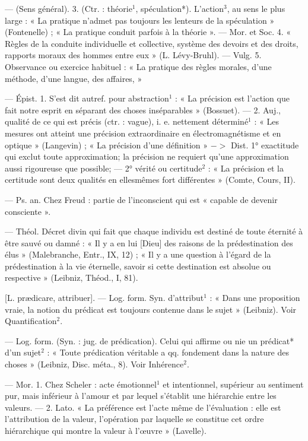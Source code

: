 \begin{itemize}[leftmargin=1cm, label=, itemsep=1pt]
 — (Sens général).
3. (Ctr. : théorie$^1$, spéculation*).
L'action$^3$, au sens le plus large : « La
pratique n’admet pas toujours les
lenteurs de la spéculation » (Fontenelle) ; « La pratique conduit parfois
à la théorie ». — Mor. et Soc. 4.
« Règles de la conduite individuelle
et collective, système des devoirs et
des droits, rapports moraux des
hommes entre eux » (L. Lévy-Bruhl). — Vulg. 5. Observance ou
exercice habituel : « La pratique
des règles morales, d’une méthode,
d’une langue, des affaires, »

 — Épist. 1. S’est dit autref.
pour abstraction$^1$ : « La précision
est l’action que fait notre esprit en
séparant des choses inséparables »
(Bossuet). — 2. Auj., qualité de ce
qui est précis (ctr. : vague), i. e. nettement déterminé$^1$ : « Les mesures
ont atteint une précision extraordinaire en électromagnétisme et en
optique » (Langevin) ; « La précision
d'une définition » $->$ Dist.
1° exactitude qui exclut toute approximation; la précision ne requiert
qu’une approximation aussi rigoureuse que possible; — 2° vérité ou
certitude$^2$ : « La précision et la certitude sont deux qualités en ellesmêmes fort différentes » (Comte,
Cours, II).

 — Ps. an. Chez Freud :
partie de l'inconscient qui est « capable de devenir consciente ».

 — Théol. Décret divin
qui fait que chaque individu est
destiné de toute éternité à être
sauvé ou damné : « Il y a en lui
[Dieu] des raisons de la prédestination des élus » (Malebranche, Entr.,
IX, 12) ; « Il y a une question à
l'égard de la prédestination à la vie
éternelle, savoir si cette destination est absolue ou respective »
(Leibniz, Théod., I, 81).

 [L. prædicare, attribuer].
— Log. form. Syn. d'attribut$^1$ :
« Dans une proposition vraie, la
notion du prédicat est toujours contenue dans le sujet » (Leibniz). Voir
Quantification$^2$.

 — Log. form.
(Syn. : jug. de prédication). Celui qui
affirme ou nie un prédicat* d’un
sujet$^2$ : « Toute prédication véritable
a qq. fondement dans la nature des
choses » (Leibniz, Disc. méta., 8).
Voir Inhérence$^2$.

 — Mor. 1. Chez Scheler :
acte émotionnel$^1$ et intentionnel,
supérieur au sentiment pur, mais
inférieur à l'amour et par lequel
s'établit une hiérarchie entre les
valeurs. — 2. Lato. « La préférence est
l'acte même de l'évaluation : elle
est l’attribution de la valeur, l’opération par laquelle se constitue cet
ordre hiérarchique qui montre la
valeur à l’œuvre » (Lavelle).


\end{itemize}
